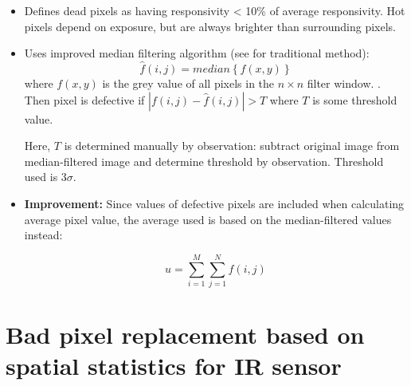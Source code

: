 \documentclass[10pt,fleqn]{article}
\begin{document}
\begin{itemize}
\item
Defines dead pixels as having responsivity < 10\% of average responsivity. Hot pixels depend on exposure, but are always brighter than surrounding pixels.

\item
Uses improved median filtering algorithm (see \cite{Meng2010} for traditional method):
\begin{equation}
\hat{f}(i,j) = median \left\lbrace f(x, y) \right\rbrace
\end{equation}
where $f(x, y)$ is the grey value of all pixels in the $n \times n$ filter window.  . Then pixel is defective if $|f(i, j) - \hat{f}(i, j)| > T$ where $T$ is some threshold value.

Here, $T$ is determined manually by observation: subtract original image from median-filtered image and determine threshold by observation. Threshold used is $3\sigma$.

\item
\textbf{Improvement:} Since values of defective pixels are included when calculating average pixel value, the average used is based on the median-filtered values instead:

\begin{equation}
u = \sum_{i=1}^M \sum_{j=1}^N \hat{f}(i, j)
\end{equation}

\end{itemize}

\section{Bad pixel replacement based on spatial statistics for IR sensor \cite{Meng2010}}
\end{document}
